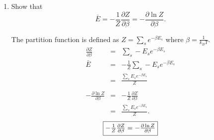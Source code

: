 \documentclass[12pt]{article}
\begin{document}
\begin{enumerate}
\begin{enumerate}
        $$\fbox{$\langle v^2 \rangle = \frac{3k_B T}{m}$}$$

		\item $v_{rms} = \sqrt{\langle v^2 \rangle}$
		\begin{eqnarray*}
            v_{rms} &=& \sqrt{\langle v^2 \rangle} \\
            &=& \sqrt{\frac{3k_B T}{m}}.
        \end{eqnarray*}

        $$\fbox{$v_{rms} = \sqrt{\frac{3k_B T}{m}}$}$$

		\item $\langle E_{KE} \rangle$
		\begin{eqnarray*}
            \langle E_{KE} \rangle &=& \frac{1}{2} m \langle v^2 \rangle \\
            &=& \frac{1}{2} m \frac{3k_B T}{m}\\
            &=& \frac{3k_B T}{2}.
        \end{eqnarray*}

        $$\fbox{$\langle E_{KE} \rangle =\frac{3k_B T}{2}$}$$
	\end{enumerate}

	\item Show that
	$$\bar{E} = -\frac{1}{Z}\frac{\partial Z}{\partial \beta} = -\frac{\partial \ln Z}{\partial \beta}.$$

	The partition function is defined as $Z = \sum_s e^{-\beta E_s}$ where $\beta = \frac{1}{k_BT}$.
    \begin{eqnarray*}
        \frac{\partial Z}{\partial \beta} &=& \sum_s -E_s e^{-\beta E_s} \\
        \bar{E} &=& -\frac{1}{Z} \sum_s -E_s e^{-\beta E_s} \\
        &=& \frac{\sum_s E_s e^{-\beta E_s}}{Z} \\
        \\
        -\frac{\partial \ln Z}{\partial \beta} &=& -\frac{1}{Z} \frac{\partial Z}{\partial \beta} \\
        &=& \frac{\sum_s E_s e^{-\beta E_s}}{Z}.
    \end{eqnarray*}
    $$\fbox{$-\frac{1}{Z}\frac{\partial Z}{\partial \beta} = -\frac{\partial \ln Z}{\partial \beta}$}$$
\end{enumerate}
\end{document}
